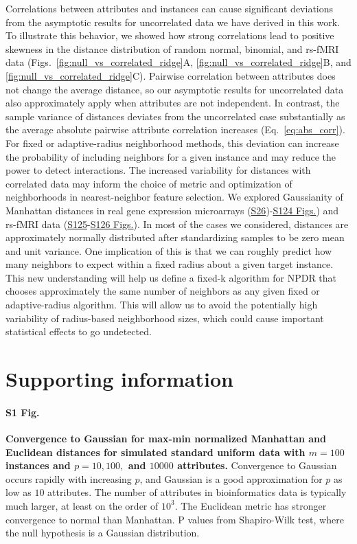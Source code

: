 \documentclass[10pt,letterpaper]{article}
\begin{document}
Correlations between attributes and instances can cause significant deviations from the asymptotic results for uncorrelated data we have derived in this work. To illustrate this behavior, we showed how strong correlations lead to positive skewness in the distance distribution of random normal, binomial, and rs-fMRI data (Figs.~\ref{fig:null_vs_correlated_ridge}A, \ref{fig:null_vs_correlated_ridge}B, and \ref{fig:null_vs_correlated_ridge}C). Pairwise correlation between attributes does not change the average distance, so our asymptotic results for uncorrelated data also approximately apply when attributes are not independent. In contrast, the sample variance of distances deviates from the uncorrelated case substantially as the average absolute pairwise attribute correlation increases (Eq.~\ref{eq:abs_corr}). For fixed or adaptive-radius neighborhood methods, this deviation can increase the probability of including neighbors for a given instance and may reduce the power to detect interactions. The increased variability for distances with correlated data may inform the choice of metric and optimization of neighborhoods in nearest-neighbor feature selection. We explored Gaussianity of Manhattan distances in real gene expression microarrays (\hyperlink{S26_Fig}{S26})-\hyperlink{S124_Fig}{S124 Figs.}) and rs-fMRI data (\hyperlink{S125_Fig}{S125}-\hyperlink{S126_Fig}{S126 Figs.}). In most of the cases we considered, distances are approximately normally distributed after standardizing samples to be zero mean and unit variance. One implication of this is that we can roughly predict how many neighbors to expect within a fixed radius about a given target instance. This new understanding will help us define a fixed-k algorithm for NPDR that chooses approximately the same number of neighbors as any given fixed or adaptive-radius algorithm. This will allow us to avoid the potentially high variability of radius-based neighborhood sizes, which could cause important statistical effects to go undetected.

\section{Supporting information}

\paragraph*{S1 Fig.}
\hypertarget{S1_Fig}{{\bf Convergence to Gaussian for max-min normalized Manhattan and Euclidean distances for simulated standard uniform data with $m=100$ instances and $p=10, 100,$ and $10000$ attributes.} Convergence to Gaussian occurs rapidly with increasing $p$, and Gaussian is a good approximation for $p$ as low as $10$ attributes. The number of attributes in bioinformatics data is typically much larger, at least on the order of $10^3$. The Euclidean metric has stronger convergence to normal than Manhattan. P values from Shapiro-Wilk test, where the null hypothesis is a Gaussian distribution.}
\end{document}
